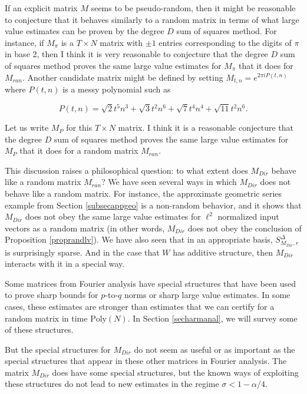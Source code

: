 \documentclass{amsart}
\newcommand{\Poly}{\textrm{Poly}}
\begin{document}
If an explicit matrix $M$ seems to be pseudo-random,  then it might be reasonable to conjecture that it behaves similarly to a random matrix in terms of what large value estimates can be proven by the degree $D$ sum of squares method.   For instance,  if $M_\pi$ is a $T \times N$ matrix with $\pm 1$ entries corresponding to the digits of $\pi$ in base 2,  then I think it is very reasonable to conjecture that the degree $D$ sum of squares method proves the same large value estimates for $M_\pi$ that it does for $M_{ran}$.   Another candidate matrix might be defined by setting $M_{t,n} = e^{2 \pi i P(t,n)}$ where $P(t,n)$ is a messy polynomial such as

$$ P(t,n) = \sqrt{2} t^5 n^3 + \sqrt{3} t^2 n^6 + \sqrt{7} t^4 n^4 + \sqrt{11} t^2 n^6. $$

\noindent Let us write $M_P$ for this $T \times N$ matrix.   I think it is a reasonable conjecture that the degree $D$ sum of squares method proves the same large value estimates for $M_P$ that it does for a random matrix $M_{ran}$.  

This discussion raises a philosophical question: to what extent does $M_{Dir}$ behave like a random matrix $M_{ran}$?  We have seen several ways in which $M_{Dir}$ does not behave like a random matrix.   For instance,  the approximate geometric series example from Section 
\ref{subsecappgeo} is a non-random behavior,  and it shows that $M_{Dir}$ does not obey the same large value estimates for $\ell^2$ normalized input vectors as a random matrix (in other words, $M_{Dir}$ does not obey the conclusion of Proposition \ref{proprandlv}).   We have also seen that in an appropriate basis,  $S_{M_{Dir}, r}^\Delta$ is surprisingly sparse.   And in the case that $W$ has additive structure,  then $M_{Dir}$ interacts with it in a special way.

Some matrices from Fourier analysis have special structures that have been used to prove sharp bounds for $p$-to-$q$ norms or sharp large value estimates.   In some cases,  these estimates are stronger than estimates that we can certify for a random matrix in time $\Poly(N)$.   In Section \ref{secharmanal},  we will survey some of these structures. 

But the special structures for $M_{Dir}$ do not seem as useful or as important as the special structures that appear in these other matrices in Fourier analysis.    The matrix $M_{Dir}$ does have some special structures,  but the known ways of exploiting these structures do not lead to new estimates in the regime $\sigma < 1 - \alpha/4$.  
\end{document}
